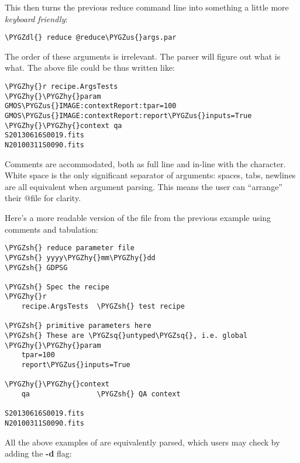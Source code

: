 \documentclass[letterpaper,10pt,english]{sphinxmanual}
\def\PYGZus{\char`\_}
\def\PYGZsh{\char`\#}
\def\PYGZdl{\char`\$}
\def\PYGZhy{\char`\-}
\def\PYGZsq{\char`\'}
\begin{document}
This then turns the previous reduce command line into something a little more
\emph{keyboard friendly}:

\begin{Verbatim}[commandchars=\\\{\}]
\PYGZdl{} reduce @reduce\PYGZus{}args.par
\end{Verbatim}

The order of these arguments is irrelevant. The parser will figure out what is
what. The above file could be thus written like:

\begin{Verbatim}[commandchars=\\\{\}]
\PYGZhy{}r recipe.ArgsTests
\PYGZhy{}\PYGZhy{}param
GMOS\PYGZus{}IMAGE:contextReport:tpar=100
GMOS\PYGZus{}IMAGE:contextReport:report\PYGZus{}inputs=True
\PYGZhy{}\PYGZhy{}context qa
S20130616S0019.fits
N20100311S0090.fits
\end{Verbatim}

Comments are accommodated, both as full line and in-line with the \code{\#}
character.  White space is the only significant separator of arguments: spaces,
tabs, newlines are all equivalent when argument parsing.  This means
the user can ``arrange'' their @file for clarity.

Here's a more readable version of the file from the previous example
using comments and tabulation:

\begin{Verbatim}[commandchars=\\\{\}]
\PYGZsh{} reduce parameter file
\PYGZsh{} yyyy\PYGZhy{}mm\PYGZhy{}dd
\PYGZsh{} GDPSG

\PYGZsh{} Spec the recipe
\PYGZhy{}r
    recipe.ArgsTests  \PYGZsh{} test recipe

\PYGZsh{} primitive parameters here
\PYGZsh{} These are \PYGZsq{}untyped\PYGZsq{}, i.e. global
\PYGZhy{}\PYGZhy{}param
    tpar=100
    report\PYGZus{}inputs=True

\PYGZhy{}\PYGZhy{}context
    qa                \PYGZsh{} QA context

S20130616S0019.fits
N20100311S0090.fits
\end{Verbatim}

All the above  examples of  are equivalently parsed, which
users may check by adding the \textbf{-d} flag:
\end{document}
